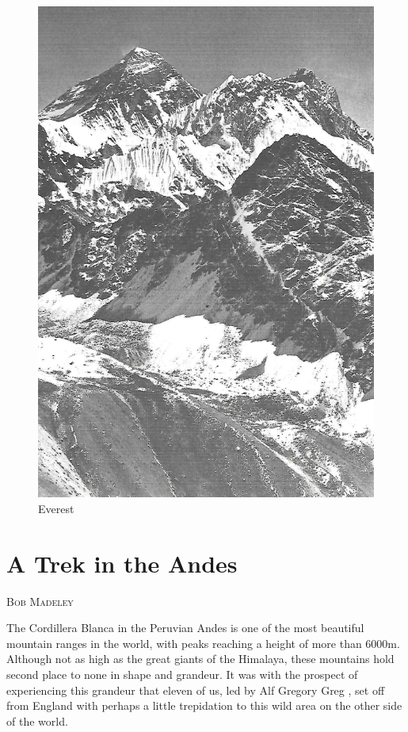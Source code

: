 \documentclass[a5paper,openany,font 10pt]{scrbook}
\makeatletter
\newcommand{\chapterauthor}[1]{%
{\parindent0pt\vspace*{-5pt}%
\linespread{1.1}\large\scshape#1%
\par\nobreak\vspace*{35pt}}
\@afterheading%
}
\makeatother
\begin{document}
\begin{figure}[htb]
\centering
\includegraphics[width=.9\linewidth]{./images/Everest.jpg}
\caption{\label{fig:org0359462}
Everest}
\end{figure}

\chapter{A Trek in the Andes}
\label{sec:org6743fc9}
\chapterauthor{Bob Madeley}

The Cordillera Blanca in the Peruvian Andes is one of the
most beautiful mountain ranges in the world, with peaks reaching
a height of more than 6000m. Although not as high as the great
giants of the Himalaya, these mountains hold second place to none
in shape and grandeur. It was with the prospect of experiencing
this grandeur that eleven of us, led by Alf Gregory  Greg , set
off from England with perhaps a little trepidation to this wild
area on the other side of the world.
\end{document}
